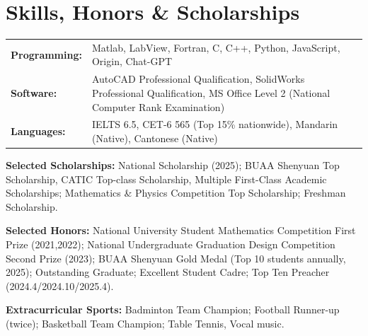 \documentclass[a4paper,12pt]{article}
\begin{document}
\section{\textbf{Skills, Honors \& Scholarships}}
\begin{tabularx}{\linewidth}{@{}l X@{}}
\textbf{Programming:} & Matlab, LabView, Fortran, C, C++, Python, JavaScript, Origin, Chat-GPT \\
\textbf{Software:} & AutoCAD Professional Qualification, SolidWorks Professional Qualification, MS Office Level 2 (National Computer Rank Examination)\\
\textbf{Languages:} & IELTS 6.5, CET-6 565 (Top 15\% nationwide), Mandarin (Native), Cantonese (Native)\\
\end{tabularx}

\vspace{6pt}
\textbf{Selected Scholarships:} National Scholarship (2025); BUAA Shenyuan Top Scholarship, CATIC Top-class Scholarship, Multiple First-Class Academic Scholarships; Mathematics \& Physics Competition Top Scholarship; Freshman Scholarship.

\vspace{6pt}
\textbf{Selected Honors:} National University Student Mathematics Competition First Prize (2021,2022); National Undergraduate Graduation Design Competition Second Prize (2023); BUAA Shenyuan Gold Medal (Top 10 students annually, 2025); Outstanding Graduate; Excellent Student Cadre; Top Ten Preacher (2024.4/2024.10/2025.4).

\vspace{6pt}
\textbf{Extracurricular Sports:} Badminton Team Champion; Football Runner-up (twice); Basketball Team Champion; Table Tennis, Vocal music.

%
\end{document}
